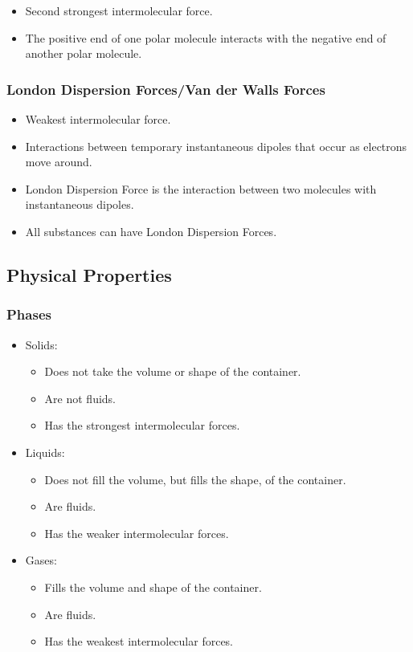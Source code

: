 \documentclass{article}
\begin{document}
\begin{itemize}
    \item Second strongest intermolecular force.
    \item The positive end of one polar molecule interacts with the negative end of another polar molecule.
\end{itemize}

\subsubsection{London Dispersion Forces/Van der Walls Forces}

\begin{itemize}
    \item Weakest intermolecular force.
    \item Interactions between temporary instantaneous dipoles that occur as electrons move around.
    \item London Dispersion Force is the interaction between two molecules with instantaneous dipoles.
    \item All substances can have London Dispersion Forces.
\end{itemize}

\subsection{Physical Properties}

\subsubsection{Phases}

\begin{itemize}
    \item Solids:
    \begin{itemize}
        \item Does not take the volume or shape of the container.
        \item Are not fluids.
        \item Has the strongest intermolecular forces.
    \end{itemize}
    \item Liquids:
    \begin{itemize}
        \item Does not fill the volume, but fills the shape, of the container.
        \item Are fluids.
        \item Has the weaker intermolecular forces.
    \end{itemize}
    \item Gases:
    \begin{itemize}
        \item Fills the volume and shape of the container.
        \item Are fluids.
        \item Has the weakest intermolecular forces.
    \end{itemize}
\end{itemize}
\end{document}
